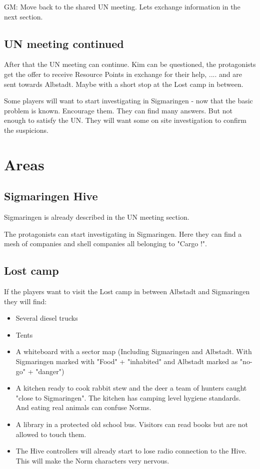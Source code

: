 GM: Move back to the shared UN meeting. Lets exchange information in the next section.

\subsection{UN meeting continued}

After that the UN meeting can continue. Kim can be questioned, the protagonists get the offer to receive Resource Points in exchange for their help, .... and are sent towards Albstadt. Maybe with a short stop at the Lost camp in between.

Some players will want to start investigating in Sigmaringen - now that the basic problem is known. Encourage them. They can find many answers. But not enough to satisfy the UN. They will want some on site investigation to confirm the suspicions.

\section{Areas}

\subsection{Sigmaringen Hive}

Sigmaringen is already described in the UN meeting section.

The protagonists can start investigating in Sigmaringen. Here they can find a mesh of companies and shell companies all belonging to "Cargo !".

\subsection{Lost camp}

If the players want to visit the Lost camp in between Albstadt and Sigmaringen they will find:

\begin{itemize}
    \item Several diesel trucks
    \item Tents
    \item A whiteboard with a sector map (Including Sigmaringen and Albstadt. With Sigmaringen marked with "Food" + "inhabited" and Albstadt marked as "no-go" + "danger")
    \item A kitchen ready to cook rabbit stew and the deer a team of hunters caught "close to Sigmaringen". The kitchen has camping level hygiene standards. And eating real animals can confuse Norms.
    \item A library in a protected old school bus. Visitors can read books but are not allowed to touch them.
    \item The Hive controllers will already start to lose radio connection to the Hive. This will make the Norm characters very nervous.
\end{itemize}


